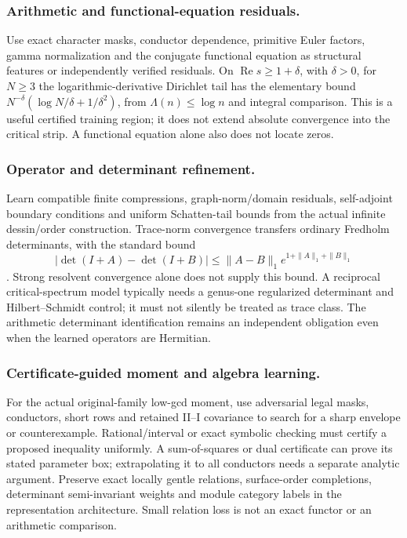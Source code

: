 \documentclass[11pt]{article}
\theoremstyle{definition}\newtheorem{definition}[theorem]{Definition}
\theoremstyle{remark}\newtheorem{remark}[theorem]{Remark}
\begin{document}
\subsubsection{Arithmetic and functional-equation residuals.}
Use exact character masks, conductor dependence, primitive Euler factors,
gamma normalization and the conjugate functional equation as structural
features or independently verified residuals. On $\operatorname{Re}s\ge1+\delta$,
with $\delta>0$, for $N\ge3$ the logarithmic-derivative Dirichlet tail has the elementary bound
$N^{-\delta}(\log N/\delta+1/\delta^2)$, from
$\Lambda(n)\le\log n$ and integral comparison. This is a useful certified
training region; it does not extend absolute convergence into the critical
strip. A functional equation alone also does not locate zeros.

\subsubsection{Operator and determinant refinement.}
Learn compatible finite compressions, graph-norm/domain residuals,
self-adjoint boundary conditions and uniform Schatten-tail bounds from the
actual infinite dessin/order construction. Trace-norm convergence transfers
ordinary Fredholm determinants, with the standard bound
\[
 |\det(I+A)-\det(I+B)|
 \le\|A-B\|_1e^{1+\|A\|_1+\|B\|_1}
\]
\cite{HLFredholm}. Strong resolvent convergence alone does not supply this
bound. A reciprocal critical-spectrum model typically needs a genus-one
regularized determinant and Hilbert--Schmidt control; it must not silently
be treated as trace class. The arithmetic determinant identification remains
an independent obligation even when the learned operators are Hermitian.

\subsubsection{Certificate-guided moment and algebra learning.}
For the actual original-family low-gcd moment, use adversarial legal masks,
conductors, short rows and retained II--I covariance to search for a sharp
envelope or counterexample. Rational/interval or exact symbolic checking must
certify a proposed inequality uniformly. A sum-of-squares or dual certificate
can prove its stated parameter box; extrapolating it to all conductors needs
a separate analytic argument. Preserve exact locally gentle relations,
surface-order completions, determinant semi-invariant weights and module
category labels in the representation architecture. Small relation loss is
not an exact functor or an arithmetic comparison.
\end{document}
